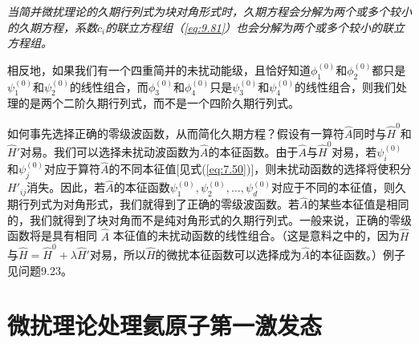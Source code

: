     \textit{ 当简并微扰理论的久期行列式为块对角形式时，久期方程会分解为两个或多个较小的久期方程，系数$c_i$的联立方程组（\ref{eq:9.81}）也会分解为两个或多个较小的联立方程组。}

    相反地，如果我们有一个四重简并的未扰动能级，且恰好知道$\phi_1^{\left(0\right)}$和$\phi_2^{\left(0\right)}$都只是$\psi_1^{\left(0\right)}$和$\psi_2^{\left(0\right)}$的线性组合，而$\phi_3^{\left(0\right)}$和$\phi_4^{\left(0\right)}$只是$\psi_3^{\left(0\right)}$和$\psi_4^{\left(0\right)}$的线性组合，则我们处理的是两个二阶久期行列式，而不是一个四阶久期行列式。

    如何事先选择正确的零级波函数，从而简化久期方程？假设有一算符$\hat{A}$同时与$\hat{H}^0$和$\hat{H}'$对易。我们可以选择未扰动波函数为$\hat{A}$的本征函数。由于$\hat{A}$与$\hat{H}^0$对易，若$\psi_i^{\left(0\right)}$和$\psi_j^{\left(0\right)}$对应于算符$\hat{A}$的不同本征值[见式(\ref{eq:7.50})]，则未扰动函数的选择将使积分$H'_{ij}$消失。因此，若$\hat{A}$的本征函数$\psi_1^{\left(0\right)}, \psi_2^{\left(0\right)}, \ldots, \psi_d^{\left(0\right)}$对应于不同的本征值，则久期行列式为对角形式，我们就得到了正确的零级波函数。若$\hat{A}$的某些本征值是相同的，我们就得到了块对角而不是纯对角形式的久期行列式。一般来说，正确的零级函数将是具有相同 $\hat{A}$ 本征值的未扰动函数的线性组合。（这是意料之中的，因为$\hat{H}$与$\hat{H} = \hat{H}^0 + \lambda\hat{H}'$对易，所以$\hat{H}$的微扰本征函数可以选择成为$\hat{A}$的本征函数。）例子见问题9.23。

\section{微扰理论处理氦原子第一激发态}
\label{sec:9.7 Perturbation Treatment of the First Excited State of Helium}

